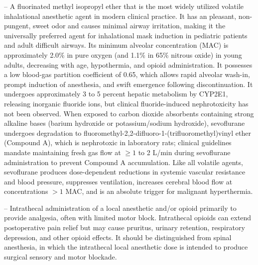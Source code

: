 -- A fluorinated methyl isopropyl ether that is the most widely utilized volatile inhalational anesthetic agent in modern clinical practice. It has an pleasant, non-pungent, sweet odor and causes minimal airway irritation, making it the universally preferred agent for inhalational mask induction in pediatric patients and adult difficult airways. Its minimum alveolar concentration (MAC) is approximately 2.0\% in pure oxygen (and 1.1\% in 65\% nitrous oxide) in young adults, decreasing with age, hypothermia, and opioid administration. It possesses a low blood-gas partition coefficient of 0.65, which allows rapid alveolar wash-in, prompt induction of anesthesia, and swift emergence following discontinuation. It undergoes approximately 3 to 5 percent hepatic metabolism by CYP2E1, releasing inorganic fluoride ions, but clinical fluoride-induced nephrotoxicity has not been observed. When exposed to carbon dioxide absorbents containing strong alkaline bases (barium hydroxide or potassium/sodium hydroxide), sevoflurane undergoes degradation to fluoromethyl-2,2-difluoro-1-(trifluoromethyl)vinyl ether (Compound A), which is nephrotoxic in laboratory rats; clinical guidelines mandate maintaining fresh gas flow at $\ge 1$ to 2 L/min during sevoflurane administration to prevent Compound A accumulation. Like all volatile agents, sevoflurane produces dose-dependent reductions in systemic vascular resistance and blood pressure, suppresses ventilation, increases cerebral blood flow at concentrations $>1$ MAC, and is an absolute trigger for malignant hyperthermia.

-- Intrathecal administration of a local anesthetic and/or opioid primarily to provide analgesia, often with limited motor block. Intrathecal opioids can extend postoperative pain relief but may cause pruritus, urinary retention, respiratory depression, and other opioid effects. It should be distinguished from spinal anesthesia, in which the intrathecal local anesthetic dose is intended to produce surgical sensory and motor blockade.

